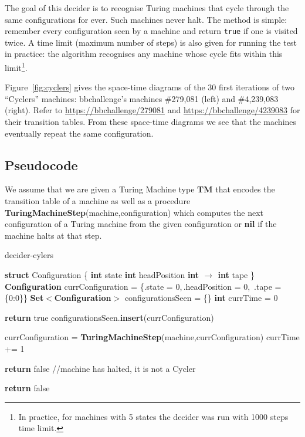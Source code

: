 The goal of this decider is to recognise Turing machines that cycle through the same configurations for ever. Such machines never halt. The method is simple: remember every configuration seen by a machine and return \texttt{true} if one is visited twice. A time limit (maximum number of steps) is also given for running the test in practice: the algorithm recognises any machine whose cycle fits within this limit\footnote{In practice, for machines with 5 states the decider was run with 1000 steps time limit.}.


\begin{example}
  Figure~\ref{fig:cyclers} gives the space-time diagrams of the 30 first iterations of two ``Cyclers'' machines: bbchallenge's machines \#279,081 (left) and \#4,239,083 (right). Refer to \url{https://bbchallenge/279081} and
  \url{https://bbchallenge/4239083} for their transition tables. From these space-time diagrams we see that the machines eventually repeat the same configuration.
\end{example}

\newpage
\subsection{Pseudocode}

We assume that we are given a Turing Machine type \textbf{TM} that encodes the transition table of a machine as well as a procedure \textbf{TuringMachineStep}(machine,configuration) which computes the next configuration of a Turing machine from the given configuration or \textbf{nil} if the machine halts at that step.

\begin{algorithm}
  \caption{{\sc decider-cylers}}\label{alg:cyclers}

  \begin{algorithmic}[1]

    \State \textbf{struct} Configuration \{
    \State \tabi\textbf{int} state
    \State \tabi\textbf{int} headPosition
    \State \tabi\textbf{int $\boldsymbol{\to}$ int} tape
    \State \}
    \State
    \State \textbf{Configuration} currConfiguration = \{.state = 0,$\,$.headPosition = 0,$\,$ .tape = \{0:0\}\}
    \State \textbf{Set$\boldsymbol{<}$Configuration$\boldsymbol{>}$} configurationsSeen = \{\}
    \State \textbf{int} currTime = 0

    \State \textbf{return} true
    \EndIf
    \State configurationsSeen.\textbf{insert}(currConfiguration)

    \State currConfiguration = \textbf{TuringMachineStep}(machine,currConfiguration)
    \State currTime += 1


    \State \textbf{return} false //machine has halted, it is not a Cycler
    \EndIf
    \EndWhile

    \State \textbf{return} false
    \EndProcedure

  \end{algorithmic}
\end{algorithm}

